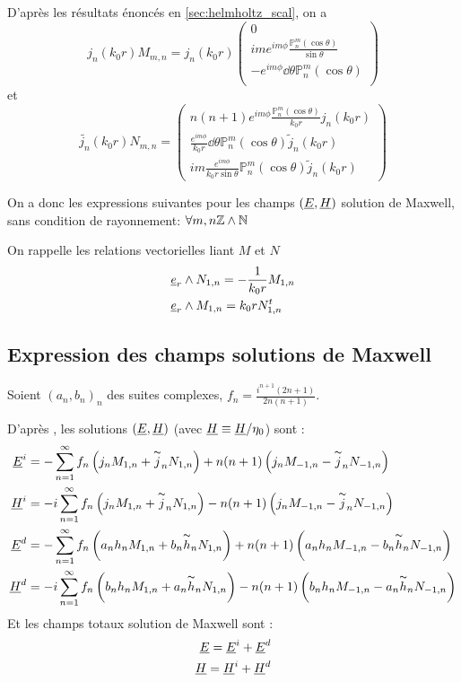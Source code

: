 D'après les résultats énoncés en \ref{sec:helmholtz_scal}, on a
\[
  j_n(k_0r)M_{m,n} = j_n(k_0r)
  \begin{pmatrix}
    0\\
    ime^{im\phi}\frac{\mathbb{P}^m_n(\cos\theta)}{\sin\theta}\\
    -e^{im\phi}\dd{\theta}{\mathbb{P}^m_n(\cos\theta)}\\
  \end{pmatrix}
\]
et 
\[
  \tilde{j_n}(k_0r)N_{m,n}=
    \begin{pmatrix}
    n(n+1)e^{im\phi}\frac{\mathbb{P}^m_n(\cos\theta)}{k_0r}j_n(k_0r)\\
    \frac{e^{im\phi}}{k_0r}\dd{\theta}{\mathbb{P}^m_n(\cos\theta)}\tilde j_n(k_0r)\\
    im\frac{e^{im\phi}}{k_0r\sin\theta}\mathbb{P}^m_n(\cos\theta)\tilde j_n(k_0r)
  \end{pmatrix}
\]

On a donc les expressions suivantes pour les champs $(\underline{E},\underline{H})$ solution de Maxwell, sans condition de rayonnement:
$\forall m,n \mathbb Z\wedge\mathbb N$




On rappelle les relations vectorielles liant $M$ et $N$
\begin{align*}
  &\underline{e}_r \wedge N_{1,n} = -\dfrac{1}{k_0r}M_{1,n} \\
  &\underline{e}_r \wedge M_{1,n} = k_0r N_{1,n}^t
\end{align*}

\subsection{Expression des champs solutions de Maxwell}
Soient $(a_n,b_n)_n$ des suites complexes, $f_n = \frac{i^{n+1}(2n+1)}{2n(n+1)}$.

D’après \cite{morse_methods_1953}, les solutions $(\underline{E},\underline{H})$ (avec $\underline{H} \equiv \underline{H} /\eta_0 $) sont :
\begin{align*}
  \underline{E}^i &= -\sum_{n=1}^\infty f_n \left( j_nM_{1,n} + \overset{\thicksim}{j}_n N_{1,n} \right) + n(n+1)\left(j_n M_{-1,n} - \overset{\thicksim}{j}_nN_{-1,n} \right)\\
  \underline{H}^i &= -i\sum_{n=1}^\infty f_n \left( j_nM_{1,n} + \overset{\thicksim}{j}_nN_{1,n} \right) - n(n+1)\left(j_n M_{-1,n} - \overset{\thicksim}{j}_n N_{-1,n} \right)\\
  \underline{E}^d &= -\sum_{n=1}^\infty f_n \left( a_n h_nM_{1,n} + b_n\overset{\thicksim}{h}_nN_{1,n} \right) + n(n+1)\left(a_nh_nM_{-1,n} - b_n\overset{\thicksim}{h}_nN_{-1,n} \right)\\
  \underline{H}^d &= -i\sum_{n=1}^\infty f_n \left( b_nh_nM_{1,n} + a_n\overset{\thicksim}{h}_nN_{1,n} \right) - n(n+1)\left(b_nh_nM_{-1,n} - a_n\overset{\thicksim}{h}_nN_{-1,n} \right)\\
\end{align*}
Et les champs totaux solution de Maxwell sont : 
\begin{align}
  \underline{E} = \underline{E}^i + \underline{E}^d\label{eq:solEmie}\\
  \underline{H} = \underline{H}^i + \underline{H}^d\label{eq:solHmie}
\end{align}

